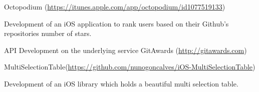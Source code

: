 

\begin{cventries}

  \cventry
    {} %
    {Octopodium (\url{https://itunes.apple.com/app/octopodium/id1077519133}) } %
    {} %
    {} %
    {
      \begin{cvitems} %
      	\item{Development of an iOS application to rank users based on their Github's repositories number of stars.}
        \item {API Development on the underlying service GitAwards (\url{http://gitawards.com})}
      \end{cvitems}
    }

  \cventry
{} %
{MultiSelectionTable(\url{https://github.com/nunogoncalves/iOS-MultiSelectionTable}) } %
{} %
{} %
{
	\begin{cvitems} %
		\item{Development of an iOS library which holds a beautiful multi selection table.}
	\end{cvitems}
}

\end{cventries}
